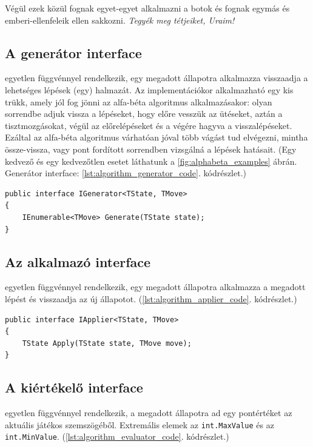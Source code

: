 \documentclass[twoside, a4paper, 12pt]{book}
\begin{document}
Végül ezek közül fognak egyet-egyet alkalmazni a botok és fognak egymás és emberi-ellenfeleik ellen sakkozni. \textit{Tegyék meg tétjeiket, Uraim!}

\subsection{A generátor interface} egyetlen függvénnyel rendelkezik, egy megadott állapotra alkalmazza visszaadja a lehetséges lépések (egy) halmazát. Az implementációkor alkalmazható egy kis trükk, amely jól fog jönni az alfa-béta algoritmus alkalmazásakor: olyan sorrendbe adjuk vissza a lépéseket, hogy előre vesszük az ütéseket, aztán a tisztmozgásokat, végül az előrelépéseket és a végére hagyva a visszalépéseket. Ezáltal az alfa-béta algoritmus várhatóan jóval több vágást tud elvégezni, mintha össze-vissza, vagy pont fordított sorrendben vizsgálná a lépések hatásait. (Egy kedvező és egy kedvezőtlen esetet láthatunk a \ref{fig:alphabeta_examples} ábrán. Generátor interface: \ref{lst:algorithm_generator_code}. kódrészlet.)

\begin{lstlisting}[caption=A generátor interface, label=lst:algorithm_generator_code]
public interface IGenerator<TState, TMove>
{
	IEnumerable<TMove> Generate(TState state);
}
\end{lstlisting}


\subsection{Az alkalmazó interface} egyetlen függvénnyel rendelkezik, egy megadott állapotra alkalmazza a megadott lépést és visszaadja az új állapotot. (\ref{lst:algorithm_applier_code}. kódrészlet.)

\begin{lstlisting}[caption=Az alkalmazó interface, label=lst:algorithm_applier_code]
public interface IApplier<TState, TMove>
{
	TState Apply(TState state, TMove move);
}
\end{lstlisting}

\subsection{A kiértékelő interface} egyetlen függvénnyel rendelkezik, a megadott állapotra ad egy pontértéket az aktuális játékos szemszögéből. Extremális elemek az \texttt{int.MaxValue} és az \texttt{int.MinValue}. (\ref{lst:algorithm_evaluator_code}. kódrészlet.)
\end{document}
